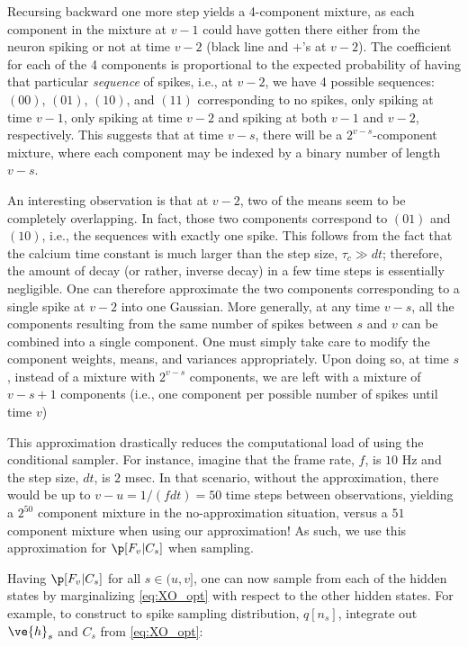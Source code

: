 Recursing backward one more step yields a 4-component mixture, as each component in the mixture at $v-1$ could have gotten there either from the neuron spiking or not at time $v-2$ (black line and $+$'s at $v-2$).  The coefficient for each of the 4 components is proportional to the expected probability of having that particular \emph{sequence} of spikes, i.e., at $v-2$, we have 4 possible sequences: $(00)$, $(01)$, $(10)$, and $(11)$ corresponding to no spikes, only spiking at time $v-1$, only spiking at time $v-2$ and spiking at both $v-1$ and $v-2$, respectively.  This suggests that at time $v-s$, there will be a $2^{v-s}$-component mixture, where each component may be indexed by a binary number of length $v-s$. 

An interesting observation is that at $v-2$, two of the means seem to be completely overlapping.  In fact, those two components correspond to $(01)$ and $(10)$, i.e., the sequences with exactly one spike.  This follows from the fact that the calcium time constant is much larger than the step size, $\tau_c \gg dt$; therefore, the amount of decay (or rather, inverse decay) in a few time steps is essentially negligible.  One can therefore approximate the two components corresponding to a single spike at $v-2$ into one Gaussian.  More generally, at any time $v-s$, all the components resulting from the same number of spikes between $s$ and $v$ can be combined into a single component.  One must simply take care to modify the component weights, means, and variances appropriately.  Upon doing so, at time $s$, instead of a mixture with $2^{v-s}$ components, we are left with a mixture of $v-s+1$ components (i.e., one component per possible number of spikes until time $v$)

This approximation drastically reduces the computational load of using the conditional sampler.  For instance, imagine that the frame rate, $f$, is $10$ Hz and the step size, $dt$, is $2$ msec.  In that scenario, without the approximation, there would be up to $v-u=1/(f dt)=50$ time steps between observations, yielding a $2^{50}$ component mixture in the no-approximation situation, versus a $51$ component mixture when using our approximation!  As such, we use this approximation for $\p[F_v | C_s]$ when sampling.  

Having $\p[F_v | C_s]$ for all $s\in(u,v]$, one can now sample from each of the hidden states by marginalizing \eqref{eq:XO_opt} with respect to the other hidden states.  For example, to construct to spike sampling distribution, $q[n_s]$, integrate out $\ve{h}_s$ and $C_s$ from \eqref{eq:XO_opt}:

